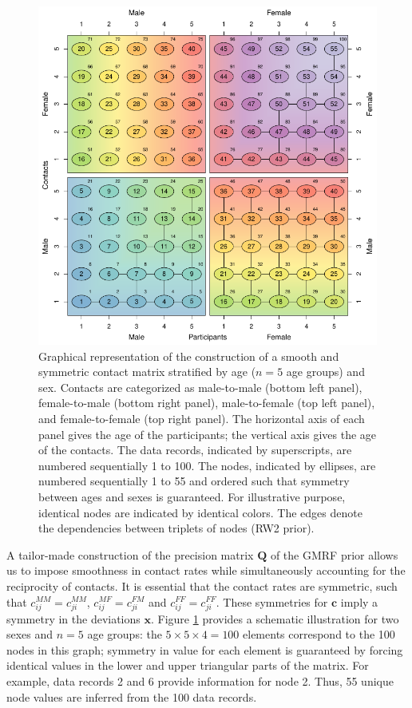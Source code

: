 \documentclass[aoas,preprint]{imsart}
\numberwithin{equation}{section}
\begin{document}
\begin{figure}
\centering
\includegraphics{fig_contact_matrix_construct.pdf}
\caption{Graphical representation of the construction of a smooth and symmetric contact matrix stratified by age ($n = 5$ age groups) and sex. Contacts are categorized as male-to-male (bottom left panel), female-to-male (bottom right panel), male-to-female (top left panel), and female-to-female (top right panel). The horizontal axis of each panel gives the age of the participants; the vertical axis gives the age of the contacts. The data records, indicated by superscripts, are numbered sequentially 1 to 100. The nodes, indicated by ellipses, are numbered sequentially 1 to 55 and ordered such that symmetry between ages and sexes is guaranteed. For illustrative purpose, identical nodes are indicated by identical colors. The edges denote the dependencies between triplets of nodes (RW2 prior).} \label{fig:1}
\end{figure}

A tailor-made construction of the precision matrix $\bm{Q}$ of the GMRF prior allows us to impose smoothness in contact rates while simultaneously accounting for the reciprocity of contacts. It is essential that the contact rates are symmetric, such that $c_\mathit{ij}^\mathit{MM} = c_\mathit{ji}^\mathit{MM}$, $c_\mathit{ij}^\mathit{MF} = c_\mathit{ji}^\mathit{FM}$ and $c_\mathit{ij}^\mathit{FF} = c_\mathit{ji}^\mathit{FF}$. These symmetries for $\bm{c}$ imply a symmetry in the deviations $\bm{x}$. Figure \ref{fig:1} provides a schematic illustration for two sexes and $n = 5$ age groups: the $5 \times 5 \times 4 = 100$ elements correspond to the 100 nodes in this graph; symmetry in value for each element is guaranteed by forcing identical values in the lower and upper triangular parts of the matrix. For example, data records 2 and 6 provide information for node 2. Thus, 55 unique node values are inferred from the 100 data records.
\end{document}

